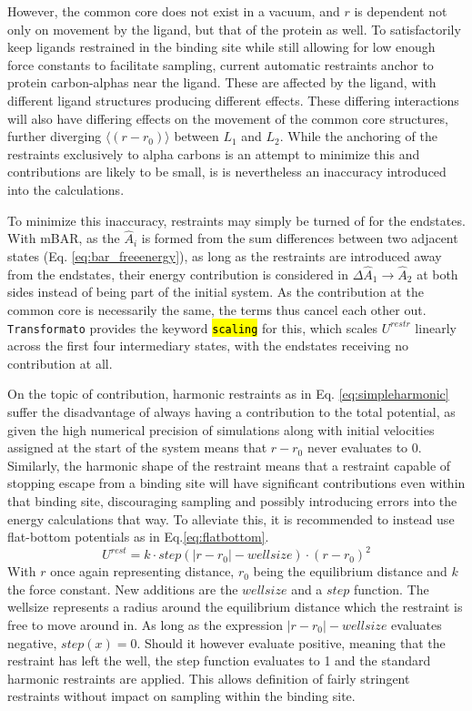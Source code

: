 \documentclass[oneside]{scrreprt}
\newcommand{\code}[1]{\texttt{\hl{#1}}}
\begin{document}
However, the common core does not exist in a vacuum, and $r$ is dependent not only on movement by the ligand, but that of the protein as well. To satisfactorily keep ligands restrained in the binding site while still allowing for low enough force constants to facilitate sampling, current automatic restraints anchor to protein carbon-alphas near the ligand. These are affected by the ligand, with different ligand structures producing different effects. These differing interactions will also have differing effects on the movement of the common core structures, further diverging $\langle (r-r_0) \rangle$ between $L_1$ and $L_2$. While the anchoring of the restraints exclusively to alpha carbons is an attempt to minimize this and contributions are likely to be small, is is nevertheless an inaccuracy introduced into the calculations.

To minimize this inaccuracy, restraints may simply be turned of for the endstates. With mBAR, as the $\hat{A}_i$ is formed from the sum differences between two adjacent states (Eq. \ref{eq:bar_freeenergy}), as long as the restraints are introduced away from the endstates, their energy contribution is considered in $\Delta \hat{A}_{1}\rightarrow \hat{A}_{2}$ at both sides instead of being part of the initial system. As the contribution at the common core is necessarily the same, the terms thus cancel each other out. \texttt{Transformato} provides the keyword \code{scaling} for this, which scales $U^{restr}$ linearly across the first four intermediary states, with the endstates receiving no contribution at all.

On the topic of contribution, harmonic restraints as in Eq. \ref{eq:simpleharmonic} suffer the disadvantage of always having a contribution to the total potential, as given the high numerical precision of simulations along with initial velocities assigned at the start of the system means that $r-r_0$ never evaluates to 0. Similarly, the harmonic shape of the restraint means that a restraint capable of stopping escape from a binding site will have significant contributions even within that binding site, discouraging sampling and possibly introducing errors into the energy calculations that way. To alleviate this, it is recommended to instead use flat-bottom potentials as in Eq.\ref{eq:flatbottom}.
\begin{equation}\label{eq:flatbottom}
    U^{rest}=k \cdot step(|r-r_0|-wellsize) \cdot (r-r_0)^2
\end{equation}
With $r$ once again representing distance, $r_0$ being the equilibrium distance and $k$ the force constant. New additions are the $wellsize$ and a $step$ function. The wellsize represents a radius around the equilibrium distance which the restraint is free to move around in. As long as the expression $|r-r_0|-wellsize$ evaluates negative, $step(x)=0$. Should it however evaluate positive, meaning that the restraint has left the well, the step function evaluates to 1 and the standard harmonic restraints are applied. This allows definition of fairly stringent restraints without impact on sampling within the binding site.
\end{document}
